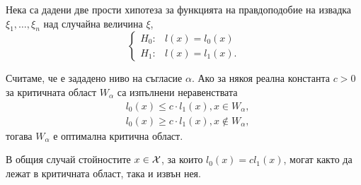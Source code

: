 \documentclass[numbers=endperiod, DIV=15, bibliography=totocnumbered]{scrartcl}
\begin{document}
\begin{lemma}
  Нека са дадени две прости хипотеза за функцията на правдоподобие на извадка $\xi_1, \ldots, \xi_n$ над случайна величина $\xi$,
  \begin{displaymath}
    \begin{cases}
      H_0: &l(x) = l_0(x) \\
      H_1: &l(x) = l_1(x).
    \end{cases}
  \end{displaymath}

  Считаме, че е зададено ниво на съгласие $\alpha$. Ако за някоя реална константа $c > 0$ за критичната област $W_\alpha$ са изпълнени неравенствата
  \begin{align*}
    &l_0(x) \leq c \cdot l_1(x), x \in W_\alpha, \\
    &l_0(x) \geq c \cdot l_1(x), x \not\in W_\alpha,
  \end{align*}
  тогава $W_\alpha$ е оптимална критична област.
\end{lemma}

\begin{note}
  В общия случай стойностите $x \in \mathcal{X}$, за които $l_0(x) = cl_1(x)$, могат както да лежат в критичната област, така и извън нея.
\end{note}
\end{document}
